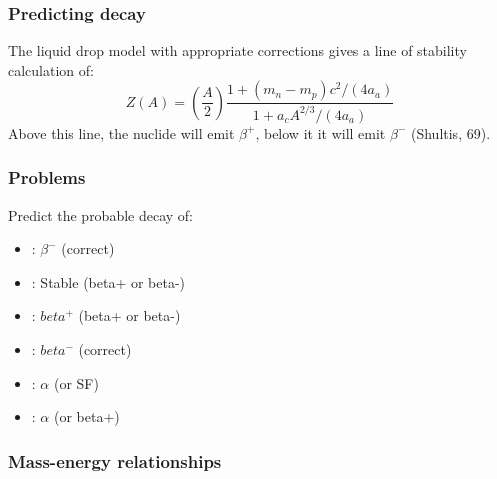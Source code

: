 \documentclass{article}
\begin{document}
\subsubsection{Predicting decay}
The liquid drop model with appropriate corrections gives a line of stability calculation of:
\begin{equation}
    Z(A) = \left( \frac{A}{2} \right) \frac{1+\left(m_n-m_p\right)c^2 / \left(4 a_a \right)}{1 + a_cA^{2/3} / \left(4 a_a \right)}
\end{equation}
Above this line, the nuclide will emit $\beta^+$, below it it will emit $\beta^-$ (Shultis, 69).

\subsubsection{Problems}
Predict the probable decay of:
\begin{itemize}
    \item {}: $\beta^-$ (correct)
    \item {}: Stable (beta+ or beta-)
    \item {}: $beta^+$ (beta+ or beta-)
    \item {}: $beta^-$ (correct)
    \item {}: $\alpha$ (or SF)
    \item {}: $\alpha$ (or beta+)
\end{itemize}

\newpage

\subsubsection{Mass-energy relationships}
\end{document}
